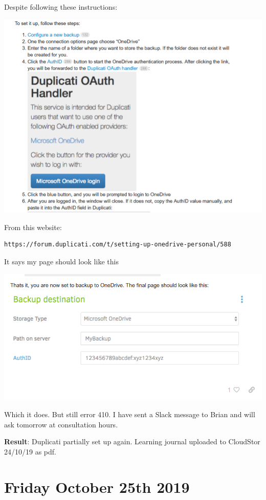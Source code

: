 \documentclass{article}
\begin{document}
Despite following these instructions:

\includegraphics[width=1.0\textwidth]{duplicati_33.PNG}

From this website: 
\begin{verbatim}https://forum.duplicati.com/t/setting-up-onedrive-personal/588\end{verbatim}

It says my page should look like this

\includegraphics[width=1.0\textwidth]{duplicati_34.PNG}

Which it does. But still error 410. I have sent a Slack message to Brian and will ask tomorrow at consultation hours.

\textbf{Result}: Duplicati partially set up again. Learning journal uploaded to CloudStor 24/10/19 as pdf.

\newpage
\section{Friday October 25th 2019}
\end{document}
